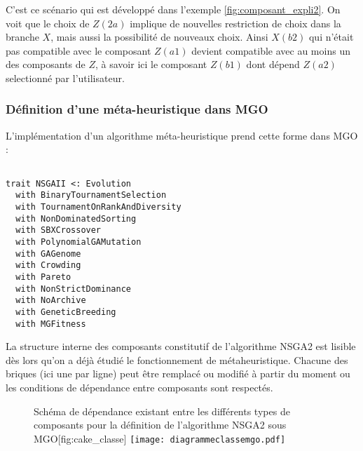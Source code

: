 C'est ce scénario qui est développé dans l'exemple \ref{fig:composant_expli2}. On voit que le choix de $Z(2a)$ implique de nouvelles restriction de choix dans la branche $X$, mais aussi la possibilité de nouveaux choix. Ainsi $X(b2)$ qui n'était pas compatible avec le composant $Z(a1)$ devient compatible avec au moins un des composants de $Z$, à savoir ici le composant $Z(b1)$ dont dépend $Z(a2)$ selectionné par l'utilisateur.


\subsubsection{Définition d'une méta-heuristique dans MGO}

L'implémentation d'un algorithme méta-heuristique prend cette forme dans MGO :

\begin{listing}[H]

\begin{verbatim}

trait NSGAII <: Evolution
  with BinaryTournamentSelection
  with TournamentOnRankAndDiversity
  with NonDominatedSorting
  with SBXCrossover
  with PolynomialGAMutation
  with GAGenome
  with Crowding
  with Pareto
  with NonStrictDominance
  with NoArchive
  with GeneticBreeding
  with MGFitness

\end{verbatim}
\caption{Exemple de définition d'une méta-heuristique dans MGO}
\label{alg:nsga2}
\end{listing}

La structure interne des composants constitutif de l'algorithme NSGA2 est lisible dès lors qu'on a déjà étudié le fonctionnement de métaheuristique. Chacune des briques (ici une par ligne) peut être remplacé ou modifié à partir du moment ou les conditions de dépendance entre composants sont respectés.

\begin{figure}[!htbp]
	\begin{sidecaption}[fortoc]{Schéma de dépendance existant entre les différents types de composants pour la définition de l'algorithme NSGA2 sous MGO}[fig:cake_classe]
		\centering
		\texttt{[image: diagrammeclassemgo.pdf]}{
		}
  \end{sidecaption}
\end{figure}

